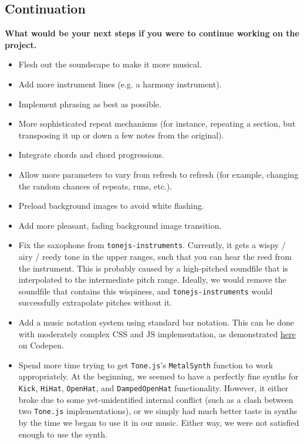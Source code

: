 \documentclass[12pt,a4paper]{article}
\newcommand{\code}{\texttt}
\newcommand{\lightcode}[1]{\colorbox{light-gray}{\texttt{#1}}}
\begin{document}
\subsection{Continuation}
\textbf{What would be your next steps if you were to continue working on the project.}
\begin{itemize}
	\item Flesh out the soundscape to make it more musical.
	\item Add more instrument lines (e.g. a harmony instrument).
	\item Implement phrasing as best as possible.
	\item More sophisticated repeat mechanisms (for instance, repeating a section, but transposing it up or down a few notes from the original).
	\item Integrate chords and chord progressions.
	\item Allow more parameters to vary from refresh to refresh (for example, changing the random chances of repeats, runs, etc.).
	\item Preload background images to avoid white flashing.
	\item Add more pleasant, fading background image transition.
	\item Fix the saxophone from \lightcode{tonejs-instruments}. Currently, it gets a wispy / airy / reedy tone in the upper ranges, such that you can hear the reed from the instrument. This is probably caused by a high-pitched soundfile that is interpolated to the intermediate pitch range. Ideally, we would remove the soundfile that contains this wispiness, and \lightcode{tonejs-instruments} would successfully extrapolate pitches without it.
	\item Add a music notation system using standard bar notation. This can be done with moderately complex CSS and JS implementation, as demonstrated \href{https://codepen.io/laviperchik/pen/mIACq}{here} on Codepen. \cite{css-musical-notes}
	\item Spend more time trying to get \lightcode{Tone.js}'s \code{MetalSynth} function to work appropriately. At the beginning, we seemed to have a perfectly fine synths for \code{Kick}, \code{HiHat}, \code{OpenHat}, and \code{DampedOpenHat} functionality. However, it either broke due to some yet-unidentified internal conflict (such as a clash between two \lightcode{Tone.js} implementations), or we simply had much better taste in synths by the time we began to use it in our music. Either way, we were not satisfied enough to use the synth.
\end{itemize}
\end{document}
